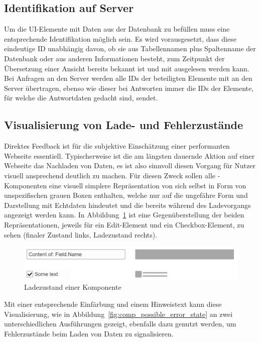 \subsection{Identifikation auf Server}
Um die UI-Elemente mit Daten aus der Datenbank zu befüllen muss eine entsprechende Identifikation möglich sein. Es wird vorausgesetzt, dass diese eindeutige ID unabhängig davon, ob sie aus Tabellennamen plus Spaltenname der Datenbank oder aus anderen Informationen besteht, zum Zeitpunkt der Übersetzung einer Ansicht bereits bekannt ist und mit ausgelesen werden kann. Bei Anfragen an den Server werden alle IDs der beteiligten Elemente mit an den Server übertragen, ebenso wie dieser bei Antworten immer die IDs der Elemente, für welche die Antwortdaten gedacht sind, sendet.

\subsection{Visualisierung von Lade- und Fehlerzustände}\label{subsec:loading_state_section}
Direktes Feedback ist für die subjektive Einschätzung einer performanten Webseite essentiell. Typischerweise ist die am längsten dauernde Aktion auf einer Webseite das Nachladen von Daten, es ist also sinnvoll diesen Vorgang für Nutzer visuell ansprechend deutlich zu machen. Für diesen Zweck sollen alle -Komponenten eine visuell simplere Repräsentation von sich selbst in Form von unspezifischen grauen Boxen enthalten, welche nur auf die ungefähre Form und Darstellung mit Echtdaten hindeutet und die bereits während des Ladevorgangs angezeigt werden kann. In Abbildung~\ref{fig:comp_loading_final_comparison} ist eine Gegenüberstellung der beiden Repräsentationen, jeweils für ein Edit-Element und ein Checkbox-Element, zu sehen (finaler Zustand links, Ladezustand rechts).

\begin{figure}
    \centering
    \captionsetup{justification=centering}
    \includegraphics[width=\textwidth]{figures/comp_loading_final_comparison.png}
        \caption{Ladezustand einer Komponente}\label{fig:comp_loading_final_comparison}
\end{figure}

Mit einer entsprechende Einfärbung und einem Hinweistext kann diese Visualisierung, wie in Abbildung~\ref{fig:comp_possible_error_state} an zwei unterschiedlichen Ausführungen gezeigt, ebenfalls dazu genutzt werden, um Fehlerzustände beim Laden von Daten zu signalisieren.

